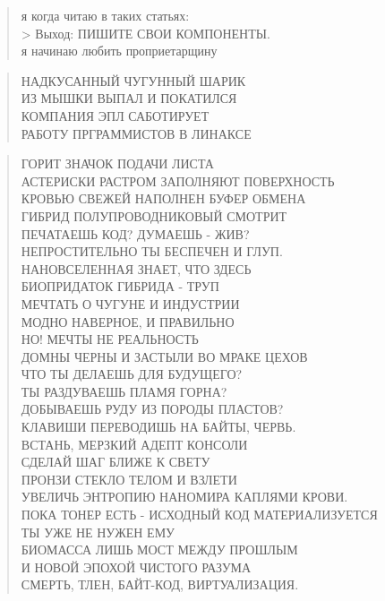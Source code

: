 \poemtitle{***}
\begin{verse}
я когда читаю в таких статьях:\\
> Выход: ПИШИТЕ СВОИ КОМПОНЕНТЫ.\\
я начинаю любить проприетарщину
\end{verse}

\poemtitle{***}
\begin{verse}
НАДКУСАННЫЙ ЧУГУННЫЙ ШАРИК\\
ИЗ МЫШКИ ВЫПАЛ И ПОКАТИЛСЯ\\
КОМПАНИЯ ЭПЛ САБОТИРУЕТ\\
РАБОТУ ПРГРАММИСТОВ В ЛИНАКСЕ
\end{verse}

\poemtitle{***}
\begin{verse}
ГОРИТ ЗНАЧОК ПОДАЧИ ЛИСТА\\
АСТЕРИСКИ РАСТРОМ ЗАПОЛНЯЮТ ПОВЕРХНОСТЬ\\
КРОВЬЮ СВЕЖЕЙ НАПОЛНЕН БУФЕР ОБМЕНА\\
ГИБРИД ПОЛУПРОВОДНИКОВЫЙ СМОТРИТ\\
ПЕЧАТАЕШЬ КОД? ДУМАЕШЬ - ЖИВ?\\
НЕПРОСТИТЕЛЬНО ТЫ БЕСПЕЧЕН И ГЛУП.\\
НАНОВСЕЛЕННАЯ ЗНАЕТ, ЧТО ЗДЕСЬ\\
БИОПРИДАТОК ГИБРИДА - ТРУП\\
МЕЧТАТЬ О ЧУГУНЕ И ИНДУСТРИИ\\
МОДНО НАВЕРНОЕ, И ПРАВИЛЬНО\\
НО! МЕЧТЫ НЕ РЕАЛЬНОСТЬ\\
ДОМНЫ ЧЕРНЫ И ЗАСТЫЛИ ВО МРАКЕ ЦЕХОВ\\
ЧТО ТЫ ДЕЛАЕШЬ ДЛЯ БУДУЩЕГО?\\
ТЫ РАЗДУВАЕШЬ ПЛАМЯ ГОРНА?\\
ДОБЫВАЕШЬ РУДУ ИЗ ПОРОДЫ ПЛАСТОВ?\\
КЛАВИШИ ПЕРЕВОДИШЬ НА БАЙТЫ, ЧЕРВЬ.\\
ВСТАНЬ, МЕРЗКИЙ АДЕПТ КОНСОЛИ\\
СДЕЛАЙ ШАГ БЛИЖЕ К СВЕТУ\\
ПРОНЗИ СТЕКЛО ТЕЛОМ И ВЗЛЕТИ\\
УВЕЛИЧЬ ЭНТРОПИЮ НАНОМИРА КАПЛЯМИ КРОВИ.\\
ПОКА ТОНЕР ЕСТЬ - ИСХОДНЫЙ КОД МАТЕРИАЛИЗУЕТСЯ\\
ТЫ УЖЕ НЕ НУЖЕН ЕМУ\\
БИОМАССА ЛИШЬ МОСТ МЕЖДУ ПРОШЛЫМ\\
И НОВОЙ ЭПОХОЙ ЧИСТОГО РАЗУМА\\
СМЕРТЬ, ТЛЕН, БАЙТ-КОД, ВИРТУАЛИЗАЦИЯ.
\end{verse}

